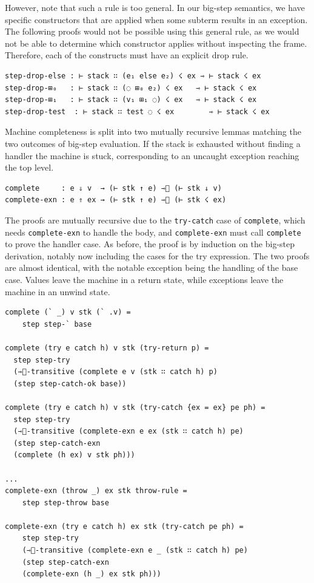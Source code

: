 However, note that such a rule is too general. In our big-step semantics, we have specific constructors that are applied when some subterm results in an exception.
The following proofs would not be possible using this general rule, as we would not be able to determine which constructor applies without inspecting the frame. Therefore, each of the constructs must have an explicit drop rule.
\begin{verbatim}
step-drop-𝚎𝚕𝚜𝚎 : ⊢ stack ∷ (e₁ 𝚎𝚕𝚜𝚎 e₂) ☇ ex ⇾ ⊢ stack ☇ ex
step-drop-⊞₀   : ⊢ stack ∷ (◌ ⊞₀ e₂) ☇ ex   ⇾ ⊢ stack ☇ ex
step-drop-⊞₁   : ⊢ stack ∷ (v₁ ⊞₁ ◌) ☇ ex   ⇾ ⊢ stack ☇ ex
step-drop-test  : ⊢ stack ∷ test ◌ ☇ ex        ⇾ ⊢ stack ☇ ex
\end{verbatim}


Machine completeness is split into two mutually recursive lemmas matching the two outcomes of big-step evaluation.
If the stack is exhausted without finding a handler the machine is stuck, corresponding to an uncaught exception reaching the top level.
\begin{verbatim}
complete     : e ⇓ v  → (⊢ stk ↑ e) ⇾⃰ (⊢ stk ↓ v)
complete-exn : e ⇑ ex → (⊢ stk ↑ e) ⇾⃰ (⊢ stk ☇ ex)
\end{verbatim}
The proofs are mutually recursive due to the \texttt{try-catch} case of \texttt{complete}, which needs \texttt{complete-exn} to handle the body, and \texttt{complete-exn} must call \texttt{complete} to prove the handler case.
As before, the proof is by induction on the big-step derivation, notably now including the cases for the try expression.
The two proofs are almost identical, with the notable exception being the handling of the base case.
Values leave the machine in a return state, while exceptions leave the machine in an unwind state.
\begin{verbatim}
complete (` _) v stk (` .v) =
    step step-` base

complete (try e catch h) v stk (try-return p) =
  step step-try
  (⇾⃰-transitive (complete e v (stk ∷ catch h) p)
  (step step-catch-ok base))

complete (try e catch h) v stk (try-catch {ex = ex} pe ph) =
  step step-try
  (⇾⃰-transitive (complete-exn e ex (stk ∷ catch h) pe)
  (step step-catch-exn
  (complete (h ex) v stk ph)))
  
...
complete-exn (throw _) ex stk throw-rule =
    step step-throw base

complete-exn (try e catch h) ex stk (try-catch pe ph) =
    step step-try
    (⇾⃰-transitive (complete-exn e _ (stk ∷ catch h) pe)
    (step step-catch-exn
    (complete-exn (h _) ex stk ph)))
\end{verbatim}

